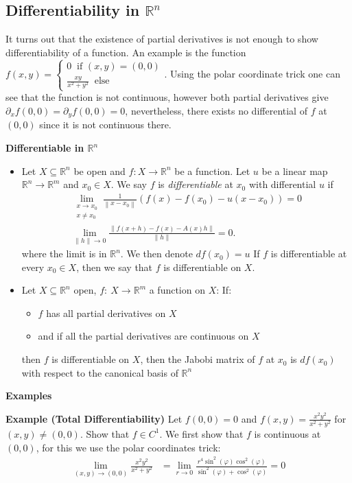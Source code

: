 \documentclass[25pt]{sciposter}
\newcommand{\R}{\mathbb{R}}
\newcommand{\norm}[1]{\left\lVert#1\right\rVert}
\newenvironment{method}[1]{\begin{mdframed}[backgroundcolor=blue!10,innertopmargin=15pt, innerbottommargin=15pt, nobreak=true]
		\textbf{#1 }
	}
	{ 
	\end{mdframed}
}
\begin{document}
\begin{multicols}{3}
\section*{Differentiability in $\R^n$}
It turns out that the existence of partial derivatives is not enough to show differentiability of a function. An example is the function $f(x,y) = \begin{cases} 
0 \ \text{ if } (x,y) = (0,0)\\
\frac{xy}{x^2+y^2} \ \text{ else}
\end{cases}$. Using the polar coordinate trick one can see that the function is not continuous, however both partial derivatives give $\partial_{x} f(0,0) = \partial_{y}f(0,0) = 0$, nevertheless, there exists no differential of $f$ at $(0,0)$ since it is not continuous there.
\begin{method}{Differentiable in $\R^n$}
	\begin{itemize}
		\item 	Let $X\subseteq \R^n$ be open and $f: X \to \R^n$ be a function. Let $u$ be a linear map $\R^n \to \R^m$ and $x_0 \in X$. We say $f$ is \textit{differentiable} at $x_0$ with differential $u$ if
		\begin{align*}
		\lim\limits_{\substack{x\to x_0 \\x \not = x_0}} \frac{1}{\norm{x-x_0}} (f(x) -f(x_0) - u(x-x_0) ) = 0\\
		\lim_{\|h\| \to 0}\frac{\|f(x+h) - f(x) - A(x)h\|}{\|h\|} = 0.
		\end{align*}
		where the limit is in $\R^n$. We then denote $df(x_0) = u$
		If $f$ is differentiable at every $x_0 \in X$, then we say that $f$ is differentiable on $X$.
		\item Let $X \subseteq \R^n$ open, $f:\ X \to \R^m$ a function on $X$: If:
		\begin{itemize}
			\item $f$ has all partial derivatives on $X$
			\item and if all the partial derivatives are continuous on $X$
		\end{itemize}
	then $f$ is differentiable on $X$, then the Jabobi matrix of $f$ at $x_0$ is $df(x_0)$ with respect to the canonical basis of $\R^n$
	\end{itemize}
\end{method}

\textbf{Examples}

\vspace{4cm}


\textbf{Example (Total Differentiability)}
Let $f(0,0) = 0$ and $f(x,y) = \frac{x^2 y^2}{x^2+y^2}$ for $(x,y)\neq (0,0)$. Show that $f \in C^1$. We first show that $f$ is continuous at $(0,0)$, for this we use the polar coordinates trick:
\begin{align*}
	\lim\limits_{(x,y)\to(0,0)} \frac{x^2 y^2}{x^2+y^2} &= \lim\limits_{r\to 0} \frac{r^4 \sin^2(\varphi)\cos^2(\varphi)}{\sin^2(\varphi) + \cos^2(\varphi)} = 0
\end{align*}


\end{multicols}
\end{document}
